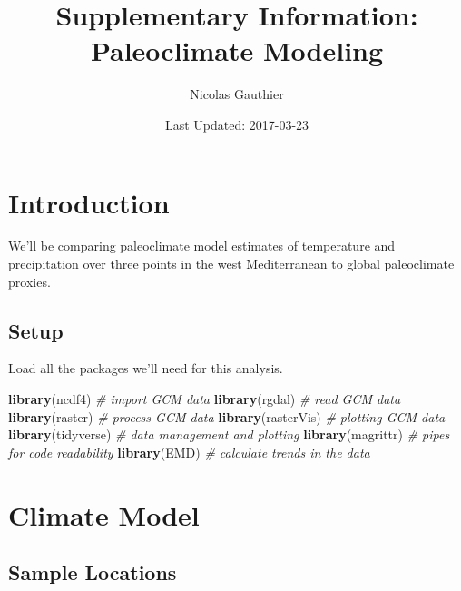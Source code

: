 \documentclass[11pt,]{tufte-handout}
\title{Supplementary Information: Paleoclimate Modeling}
\author{Nicolas Gauthier}
\date{Last Updated: 2017-03-23}
\newenvironment{Shaded}{}{}
\newcommand{\KeywordTok}[1]{\textcolor[rgb]{0.00,0.44,0.13}{\textbf{{#1}}}}
\newcommand{\CommentTok}[1]{\textcolor[rgb]{0.38,0.63,0.69}{\textit{{#1}}}}
\newcommand{\NormalTok}[1]{{#1}}
\begin{document}
\maketitle




\section{Introduction}\label{introduction}

We'll be comparing paleoclimate model estimates of temperature and
precipitation over three points in the west Mediterranean to global
paleoclimate proxies.

\subsection{Setup}\label{setup}

Load all the packages we'll need for this analysis.


\begin{Shaded}
\begin{Highlighting}[]
\KeywordTok{library}\NormalTok{(ncdf4) }\CommentTok{# import GCM data}
\KeywordTok{library}\NormalTok{(rgdal) }\CommentTok{# read GCM data}
\KeywordTok{library}\NormalTok{(raster) }\CommentTok{# process GCM data}
\KeywordTok{library}\NormalTok{(rasterVis) }\CommentTok{# plotting GCM data}
\KeywordTok{library}\NormalTok{(tidyverse) }\CommentTok{# data management and plotting}
\KeywordTok{library}\NormalTok{(magrittr) }\CommentTok{# pipes for code readability}
\KeywordTok{library}\NormalTok{(EMD) }\CommentTok{# calculate trends in the data}
\end{Highlighting}
\end{Shaded}

\section{Climate Model}\label{climate-model}

\subsection{Sample Locations}\label{sample-locations}
\end{document}
